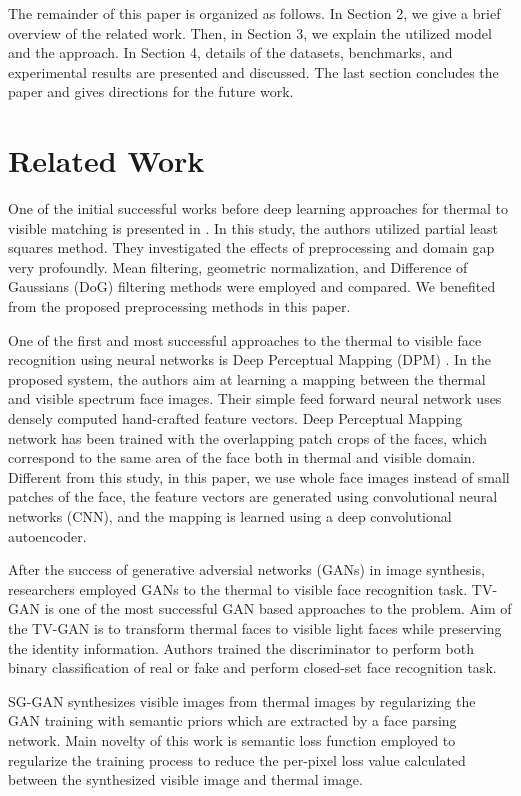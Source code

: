 \documentclass[conference]{IEEEtran}
\begin{document}
The remainder of this paper is organized as follows. In Section 2, we give a brief overview of the related work. Then, in Section 3, we explain the utilized model and the approach. In Section 4, details of the datasets, benchmarks, and experimental results are presented and discussed. The last section concludes the paper and gives directions for the future work.

\section{Related Work}

One of the initial successful works before deep learning approaches for thermal to visible matching is presented in \cite{partialleastsquares}. In this study, the authors utilized partial least squares method. They investigated the effects of preprocessing and domain gap very profoundly. Mean filtering, geometric normalization, and Difference of Gaussians (DoG) filtering methods were employed and compared. We benefited from the proposed preprocessing methods in this paper.



One of the first and most successful approaches to the thermal to visible face recognition using neural networks is Deep Perceptual Mapping (DPM) \cite{deepperceptual}. In the proposed system, the authors aim at learning a mapping between the thermal and visible spectrum face images. Their simple feed forward neural network uses densely computed hand-crafted feature vectors. Deep Perceptual Mapping network has been trained with the overlapping patch crops of the faces, which correspond to the same area of the face both in thermal and visible domain. Different from this study, in this paper, we use whole face images instead of small patches of the face, the feature vectors are generated using convolutional neural networks (CNN), and the mapping is learned using a deep convolutional autoencoder. 

After the success of generative adversial networks (GANs) in image synthesis, researchers employed GANs to the thermal to visible face recognition task. TV-GAN \cite{TVGAN} is one of the most successful GAN based approaches to the problem. Aim of the TV-GAN is to transform thermal faces to visible light faces while preserving the identity information. Authors trained the discriminator to perform both binary classification of real or fake and perform closed-set face recognition task. 

SG-GAN \cite{SGGAN} synthesizes visible images from thermal images by regularizing the GAN training with semantic priors which are extracted by a face parsing network. Main novelty of this work is semantic loss function employed to regularize the training process to reduce the per-pixel loss value calculated between the synthesized visible image and thermal image.
\end{document}
